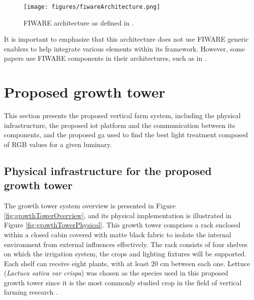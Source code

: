 \documentclass[preprint, review, 12pt]{elsarticle}
\begin{document}
\begin{figure}[htbp]
    \centering
    \texttt{[image: figures/fiwareArchitecture.png]}
    \caption{FIWARE architecture as defined in \cite{FIWARE2018}.}
    \label{fig:fiwareArchitecture}
\end{figure}





It is important to emphasize that this architecture does not use FIWARE generic enablers to help integrate various elements within its framework. However, some papers use FIWARE components in their architectures, such as in \cite{alves2023, verdouw2017, iotbds23, pereira2024, barriga2022}.

\section{Proposed growth tower}

This section presents the proposed vertical farm system, including the physical infrastructure, the proposed \gls{iot} platform and the communication between its components, and the proposed \gls{ga} used to find the best light treatment composed of RGB values for a given luminary.

\subsection{Physical infrastructure for the proposed growth tower}
\label{sec:infraestructure}

The growth tower system overview is presented in Figure \ref{fig:growthTowerOverview}, and its physical implementation is illustrated in Figure \ref{fig:growthTowerPhysical}. This growth tower comprises a rack enclosed within a closed cabin covered with matte black fabric to isolate the internal environment from external influences effectively. The rack consists of four shelves on which the irrigation system, the crops and lighting fixtures will be supported. Each shelf can receive eight plants, with at least 20 cm between each one. Lettuce (\textit{Lactuca sativa var crispa}) was chosen as the species used in this proposed growth tower since it is the most commonly studied crop in the field of vertical farming research \cite{boros2023a}.
\end{document}
